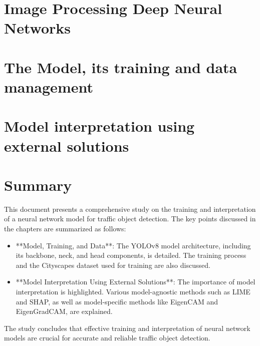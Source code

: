 \documentclass[11pt,a4paper,twoside,openright]{report}  %
\begin{document}
\section{Image Processing Deep Neural Networks}\label{sec:image-processing-deep-neural-networks}


\section[Chosen model, training and data management]{The Model, its training and data management} \label{sec:model-training-data}






\section{Model interpretation using external solutions}\label{sec:model-interpretation-application}



\section*{Summary}

This document presents a comprehensive study on the training and interpretation of a neural network
model for traffic object detection.
The key points discussed in the chapters are summarized as follows:

\begin{itemize}
    \item **Model, Training, and Data**: The YOLOv8 model architecture, including its backbone, neck, and head components, is detailed. The training process and the Cityscapes dataset used for training are also discussed.
    \item **Model Interpretation Using External Solutions**: The importance of model interpretation is highlighted. Various model-agnostic methods such as LIME and SHAP, as well as model-specific methods like EigenCAM and EigenGradCAM, are explained.
\end{itemize}

The study concludes that effective training and interpretation of neural network models are crucial for accurate and reliable traffic object detection.
\end{document}
